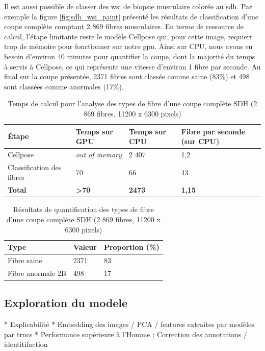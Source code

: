 Il est aussi possible de classer des \gls{wsi} de biopsie musculaire colorée au \gls{sdh}. Par exemple la figure \ref{fig:sdh_wsi_paint} présenté les résultats de classification d'une coupe complète comptant 2 869 fibres musculaires. En terme de ressource de calcul, l'étape limitante reste le modèle Cellpose qui, pour cette image, requiert trop de mémoire pour fonctionner sur notre \gls{gpu}. Ainsi sur CPU, nous avons eu besoin d'environ 40 minutes pour quantifier la coupe, dont la majorité du temps à servis à Cellpose,  ce qui représente une vitesse d'environ 1 fibre par seconde. Au final sur la coupe présentée, 2371 fibres sont classée comme saine (83\%) et 498 sont classées comme anormales (17\%).

\begin{table}[ht]
\centering
\caption{Temps de calcul pour l'analyse des types de fibre d'une coupe complète SDH (2 869 fibres, 11200 x 6300 pixels)}
\label{tab:sdh_wsi_timetable}
\begin{tabularx}{\textwidth}{|X|X|X|X|}
\hline
\textbf{Étape} & \textbf{Temps sur GPU} & \textbf{Temps sur CPU} & \textbf{Fibre par seconde (sur CPU)} \\
\toprule
Cellpose & \textit{out of memory} & 2 407 & 1,2 \\
\hline
Classification des fibres & 70 & 66 & 43 \\
\hline
\textbf{Total} & \textbf{>70} & \textbf{2473} & \textbf{1,15} \\
\hline
\end{tabularx}
\end{table}
\begin{table}[ht]
\centering
\caption{Résultats de quantification des types de fibre d'une coupe complète SDH (2 869 fibres, 11200 x 6300 pixels)}
\label{tab:sdh_wsi_resultstable}
\begin{tabularx}{\textwidth}{|X|X|X|}
\hline
\textbf{Type} & \textbf{Valeur} & \textbf{Proportion (\%)} \\
\toprule
Fibre saine & 2371 & 83 \\
\hline
Fibre anormale 2B & 498 & 17 \\
\hline
\end{tabularx}
\end{table}


\subsection{Exploration du modele}
* Explicabilité
* Embedding des images / PCA / features extraites par modèles par trucs
* Performance supérieure à l'Homme ; Correction des annotations / identitifaction


